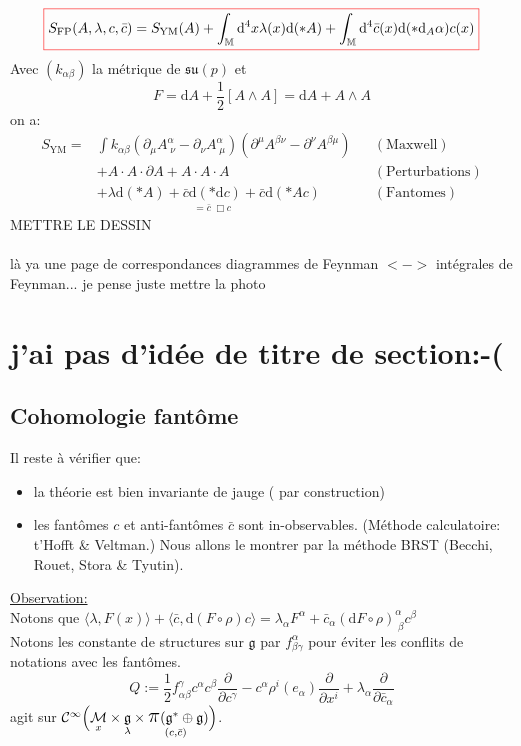 \documentclass[a4paper,11pt]{article}
\renewcommand{\d}{{\mathrm{d}}}
\newcommand{\dr}[2]{\frac{\partial {#1}}{\partial{#2}}}
\newcommand{\ppi}{{\mathlarger{\mathlarger{\mathlarger{\pi}}}}}
\begin{document}
$$\color{red}\boxed{\color{black}
S_\mathrm{FP}(A,\lambda,c,\bar c) = S_\mathrm{YM}(A)+ \int_\mathbb{M}\d^4x \lambda(x) \d(*A) + \int_\mathbb{M}\d^4 \bar c(x) \d(*\d_A\alpha) c(x)
\color{red}}\color{black}$$
Avec $(k_{\alpha\beta})$ la métrique de $\mathfrak{su}(p)$ et
$$F=\d A + \frac12[A\wedge A]= \d A + A\wedge A$$
on a:
\begin{align*}
S_\mathrm{YM} =& \int k_{\alpha\beta} (\partial_\mu A^\alpha_{\;\nu} - \partial_\nu A^\alpha_{\;\mu})(\partial^\mu A^{\beta\nu} - \partial^\nu A^{\beta\mu}) && (\mathrm{Maxwell})\\
&+A\cdot A\cdot\partial A + A\cdot A\cdot A&&(\mathrm{Perturbations})\\
&+\lambda\d(*A) + \underset{= \bar c \;\Box c}{\bar c\d(*\d c)} + \bar c\d(*A c) &&(\mathrm{Fantomes})
\end{align*}
\color{red}METTRE LE DESSIN\\ \\
là ya une page de correspondances diagrammes de Feynman $<->$ intégrales de Feynman... je pense juste mettre la photo\color{black}
\section{\color{red}j'ai pas d'idée de titre de section:-(\color{black}}
\subsection{Cohomologie fantôme}
\noindent Il reste à vérifier que:
\begin{itemize}
\item la théorie est bien invariante de jauge (\color{Green}\checkmark\color{black} par construction)
\item les fantômes $c$ et anti-fantômes $\bar c$ sont in-observables. (Méthode calculatoire: t'Hofft \& Veltman.) Nous allons le montrer par la méthode BRST (Becchi, Rouet, Stora \& Tyutin).
\end{itemize}
\underline{Observation:}\\
Notons que $\langle\lambda,F(x)\rangle + \langle\bar c, \d(F\circ\rho)c\rangle = \lambda_\alpha F^\alpha+\bar c_\alpha(\d F\circ\rho)^\alpha_{\;\beta} c^\beta$\\
Notons les constante de structures sur $\mathfrak{g}$ par $f^\alpha_{\beta\gamma}$ pour éviter les conflits de notations avec les fantômes.
$$\boxed{
Q:=\frac12 f^\gamma_{\alpha\beta} c^\alpha c^\beta\dr{}{c^\gamma} - c^\alpha\rho^i(e_\alpha)\dr{}{x^i}+\lambda_\alpha\dr{}{\bar c_\alpha}
}$$
agit sur $\mathcal{C}^\infty\Big(\underset x {\mathcal M}\times \underset \lambda {\mathfrak g} \times \underset{(c,\bar c)} {\ppi(\mathfrak g^*\oplus\mathfrak g})\Big) $.\\
\end{document}
